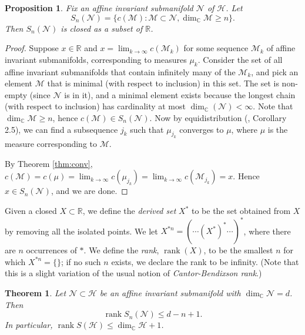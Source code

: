 \documentclass{article}
\newtheorem{thm}{Theorem}[section]
\newtheorem{prop}{Proposition}[section]
\theoremstyle{definition}
\begin{document}
\begin{prop}
   Fix an affine invariant submanifold $\mathcal{N}$ of $\mathcal{H}$.  Let
$$S_n(\mathcal{N}) = \{ c(\mathcal{M}) : \mathcal{M} \subset \mathcal{N}, \dim_{\mathbb{C}}\mathcal{M} \ge n \} .$$
Then $S_n(\mathcal{N})$ is closed as a subset of $\mathbb{R}$. 
\label{prop:dim}
\end{prop}

\begin{proof}
  Suppose $x\in \mathbb{R}$ and $x=\lim_{k\to\infty} c(\mathcal{M}_k)$ for some sequence $\mathcal{M}_k$ of affine invariant submanifolds, corresponding to measures $\mu_k$.  Consider the set of all affine invariant submanifolds that contain infinitely many of the $\mathcal{M}_k$, and pick an element $\mathcal{M}$ that is minimal (with respect to inclusion) in this set.  The set is non-empty (since $\mathcal{N}$ is in it), and a minimal element exists because the longest chain (with respect to inclusion) has cardinality at most $\dim_{\mathbb{C}}(\mathcal{N}) < \infty$.  Note that $\dim_{\mathbb{C}} \mathcal{M} \ge n$, hence $c(\mathcal{M}) \in S_n(\mathcal{N})$.  Now by equidistribution (\cite{emm2015}, Corollary 2.5), we can find a subsequence $j_k$ such that $\mu_{j_k}$ converges to $\mu$, where $\mu$ is the measure corresponding to $\mathcal{M}$.  

By Theorem \ref{thm:conv}, $c(\mathcal{M}) = c(\mu) = \lim_{k\to\infty} c(\mu_{j_k} ) = \lim_{k\to\infty}c(\mathcal{M}_{j_k})=x$.  Hence $x\in S_n(\mathcal{N})$, and we are done.  
\end{proof}

Given a closed $X\subset \mathbb{R}$, we define the \emph{derived set} $X^*$ to be the set obtained from $X$ by removing all the isolated points.  We let $X^{*n}=( \cdots (X^*)^* \cdots )^*$, where there are $n$ occurrences of $*$.  We define the \emph{rank}, $\operatorname{rank}(X)$, to be the smallest $n$ for which $X^{*n}=\{\}$; if no such $n$ exists, we declare the rank to be infinity.  (Note that this is a slight variation of the usual notion of \emph{Cantor-Bendixson rank}.)

\begin{thm}
  Let $\mathcal{N} \subset \mathcal{H}$ be an affine invariant submanifold with $\dim_{\mathbb{C}} \mathcal{N}=d$.  Then 
$$\operatorname{rank}S_n(\mathcal{N}) \le d-n+1.$$
  In particular, $\operatorname{rank} S(\mathcal{H})\le \dim_{\mathbb{C}} \mathcal{H}+1$.  
\end{thm}
\end{document}
